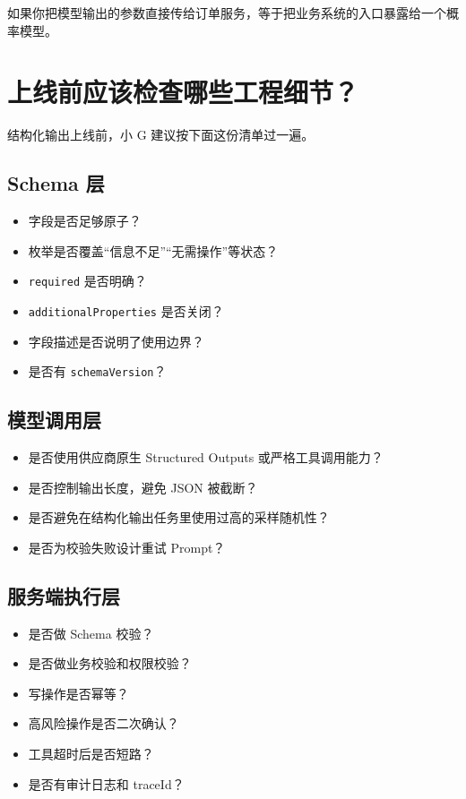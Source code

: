 \documentclass[10pt,a4paper]{ctexart}
\begin{document}
如果你把模型输出的参数直接传给订单服务，等于把业务系统的入口暴露给一个概率模型。



\section{上线前应该检查哪些工程细节？}


结构化输出上线前，小 G 建议按下面这份清单过一遍。



\subsection{Schema 层}

\begin{itemize}[itemsep=2pt, topsep=4pt]
  \item 字段是否足够原子？
  \item 枚举是否覆盖“信息不足”“无需操作”等状态？
  \item \texttt{required} 是否明确？
  \item \texttt{additionalProperties} 是否关闭？
  \item 字段描述是否说明了使用边界？
  \item 是否有 \texttt{schemaVersion}？
\end{itemize}


\subsection{模型调用层}

\begin{itemize}[itemsep=2pt, topsep=4pt]
  \item 是否使用供应商原生 Structured Outputs 或严格工具调用能力？
  \item 是否控制输出长度，避免 JSON 被截断？
  \item 是否避免在结构化输出任务里使用过高的采样随机性？
  \item 是否为校验失败设计重试 Prompt？
\end{itemize}


\subsection{服务端执行层}

\begin{itemize}[itemsep=2pt, topsep=4pt]
  \item 是否做 Schema 校验？
  \item 是否做业务校验和权限校验？
  \item 写操作是否幂等？
  \item 高风险操作是否二次确认？
  \item 工具超时后是否短路？
  \item 是否有审计日志和 traceId？
\end{itemize}
\end{document}

